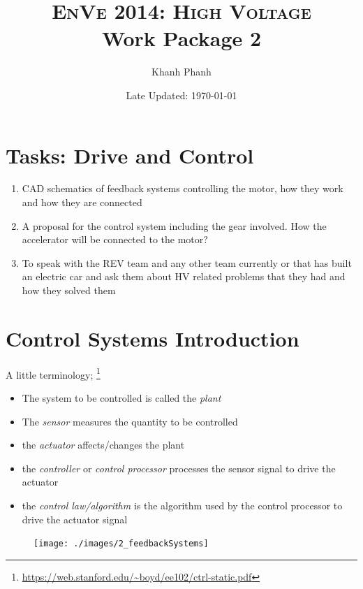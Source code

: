 \documentclass[a4paper]{article}
\title{\textsc{EnVe 2014: High Voltage} \\ \textbf{Work Package 2}}
\author{Khanh Phanh}
\date{Late Updated: \today}
\begin{document}
\pagestyle{fancy} \lhead{} \rhead{}
\maketitle
\tableofcontents

\section{Tasks: Drive and Control}
    \begin{enumerate}
        \item CAD schematics of feedback systems controlling the motor, how they
        work and how they are connected

        \item A proposal for the control system including the gear involved.
        How the accelerator will be connected to the motor?

        \item To speak with the REV team and any other team currently or that has
        built an electric car and ask them about HV related problems that they had
        and how they solved them
    \end{enumerate}

\section{Control Systems Introduction}
    A little terminology;
        \footnote{\url{https://web.stanford.edu/~boyd/ee102/ctrl-static.pdf}}
        \begin{itemize}
        \item The system to be controlled is called the \textit{plant}
        \item The \textit{sensor} measures the quantity to be controlled
        \item the \textit{actuator} affects/changes the plant
        \item the \textit{controller} or \textit{control processor} processes the
        sensor signal to drive the actuator
        \item the \textit{control law/algorithm} is the algorithm used by the
        control processor to drive the actuator signal
        \end{itemize}

    \begin{figure}
        \centering
        \texttt{[image: ./images/2\_feedbackSystems]}
    \end{figure}
\end{document}
